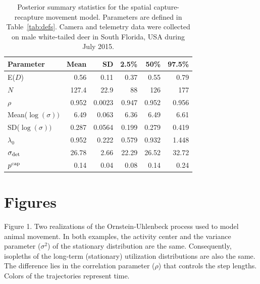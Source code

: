 \documentclass[12pt]{article}
\begin{document}
\begin{table}[h!]
  \centering
  \caption{Posterior summary statistics for the spatial
    capture-recapture movement model. Parameters are defined in Table~\ref{tab:defs}.
    Camera and telemetry data were collected on male white-tailed deer
    in South Florida, USA during July 2015.}
  \vspace{6pt}
  \begin{tabular}{lrrrrr}
    \hline
    Parameter            & Mean   & SD     & 2.5\%  & 50\%   & 97.5\% \\
    \hline
    E($D$)               & 0.56   & 0.11   & 0.37   & 0.55   & 0.79   \\ 
    $N$                  & 127.4  & 22.9   & 88     & 126    & 177    \\ 
    $\rho$               & 0.952  & 0.0023 & 0.947  & 0.952  & 0.956  \\ 
    Mean($\log(\sigma))$ & 6.49   & 0.063  & 6.36   & 6.49   & 6.61   \\ 
    SD($\log(\sigma))$   & 0.287  & 0.0564 & 0.199  & 0.279  & 0.419  \\ 
    $\lambda_0$          & 0.952  & 0.222  & 0.579  & 0.932  & 1.448  \\ 
    $\sigma_{\rm det}$   & 26.78  & 2.66   & 22.29  & 26.52  & 32.72  \\ 
    $p^{\rm cap}$        & 0.14 & 0.04 & 0.08 & 0.14 & 0.24 \\ 
    \hline
  \end{tabular}
  \label{tab:post}
\end{table}


\clearpage

\section*{Figures}

\vspace{12pt}

Figure 1. Two realizations of the Ornstein-Uhlenbeck process used to
    model animal movement. In both examples, the activity center and
    the variance parameter ($\sigma^2$) of the stationary distribution
    are the same. Consequently, isopleths of the long-term
    (stationary) utilization distributions are also the same. The
    difference lies in the correlation parameter ($\rho$) that
    controls the step lengths. Colors of the trajectories represent
    time.
\end{document}
